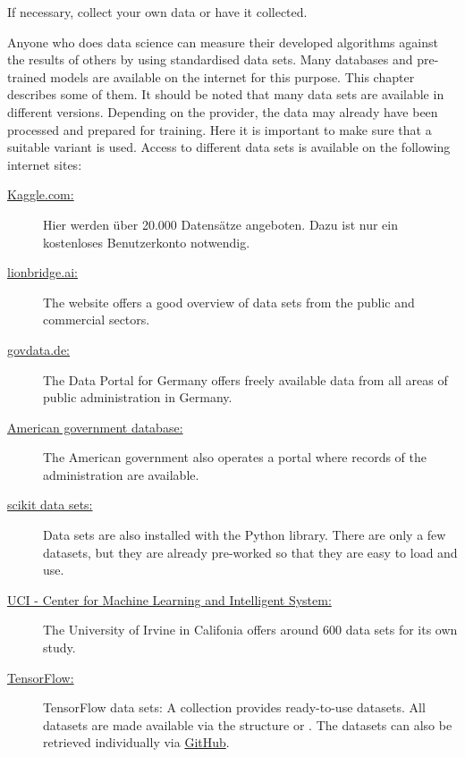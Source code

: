 {If necessary, collect your own data or have it collected.

Anyone who does data science can measure their developed algorithms against the results of others by using standardised data sets. Many databases and pre-trained models are available on the internet for this purpose. This chapter describes some of them. It should be noted that many data sets are available in different versions. Depending on the provider, the data may already have been processed and prepared for training. Here it is important to make sure that a suitable variant is used. Access to different data sets is available on the following internet sites:


\begin{description}
  \item [\href{https://www.kaggle.com/datasets}{Kaggle.com:}] Hier werden über 20.000 Datensätze angeboten. Dazu ist nur ein kostenloses Benutzerkonto notwendig.
  
  \item [\href{https://lionbridge.ai/datasets/the-50-best-free-datasets-for-machine-learning/}{lionbridge.ai:}]  The website offers a good overview of data sets from the public and commercial sectors.
  
  \item [\href{govdata.de}{govdata.de:}] The Data Portal for Germany offers freely available data from all areas of public administration in Germany.


  \item [\href{https://www.data.gov}{American government database:}] The American government also operates a portal where records of the administration are available.
  
  \item [\href{https://riptutorial.com/de/scikit-learn/example/6801/beispieldatensatze}{scikit data sets:}] Data sets are also installed with the Python library. There are only a few datasets, but they are already pre-worked so that they are easy to load and use.

  \item [\href{https://archive.ics.uci.edu/ml/datasets.php}{UCI - Center for Machine Learning and Intelligent System:}] The University of Irvine in Califonia offers around 600 data sets for its own study.
  
  \item [\href{}{TensorFlow:}] TensorFlow data sets: A collection provides ready-to-use datasets. All datasets are made available via the structure  or . The datasets can also be retrieved individually via \href{https://github.com/tensorflow/datasets/tree/master/tensorflow_datasets}{GitHub}. 


\end{description}}

